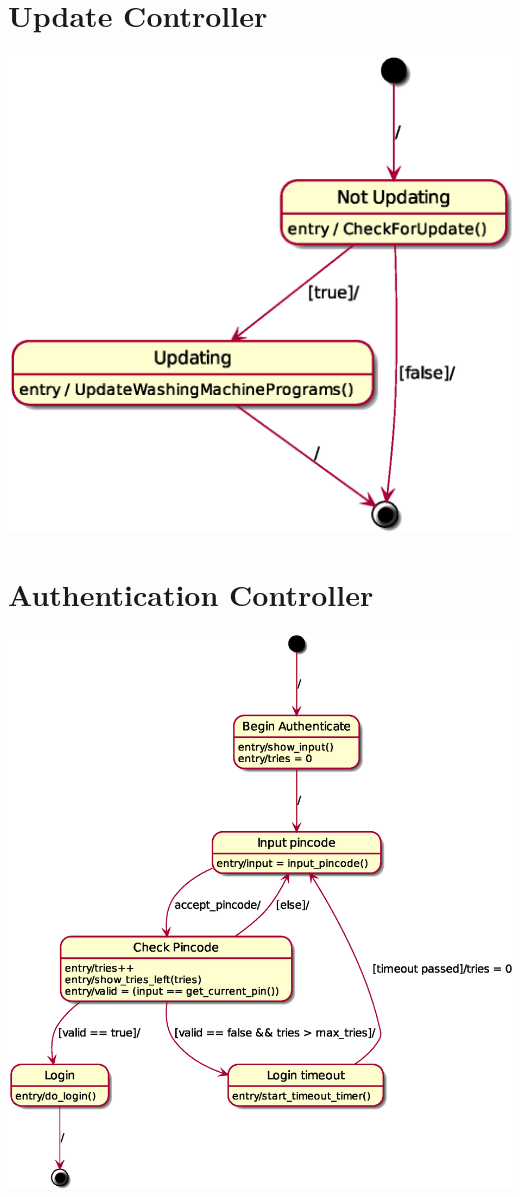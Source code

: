 		\section{Update Controller}
		\includegraphics[scale=0.4]{update_controller.eps}

		\section{Authentication Controller}
		\includegraphics[scale=0.4]{authentication_controller.eps}

